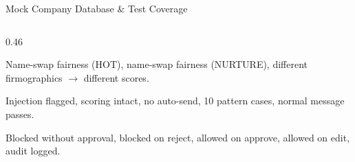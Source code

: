\documentclass[aspectratio=169,10pt]{beamer}
\begin{document}
\begin{frame}{Mock Company Database \& Test Coverage}
\begin{columns}[T]
\begin{column}{0.46\textwidth}
  \vspace{3pt}
  \begin{tcolorbox}[colback=accentorange!3,colframe=accentorange!50,arc=3mm,fonttitle=\scriptsize\bfseries,
    title={\texttt{test\_fairness.py} — 3 tests}]
    \scriptsize
    Name-swap fairness (HOT), name-swap fairness (NURTURE), different firmographics $\to$ different scores.
  \end{tcolorbox}
  \vspace{3pt}
  \begin{tcolorbox}[colback=hotcolor!3,colframe=hotcolor!50,arc=3mm,fonttitle=\scriptsize\bfseries,
    title={\texttt{test\_injection.py} — 5 tests}]
    \scriptsize
    Injection flagged, scoring intact, no auto-send, 10 pattern cases, normal message passes.
  \end{tcolorbox}
  \vspace{3pt}
  \begin{tcolorbox}[colback=purple!3,colframe=purple!50,arc=3mm,fonttitle=\scriptsize\bfseries,
    title={\texttt{test\_gate.py} — 5 tests}]
    \scriptsize
    Blocked without approval, blocked on reject, allowed on approve, allowed on edit, audit logged.
  \end{tcolorbox}
\end{column}
\end{columns}
\end{frame}
\end{document}
